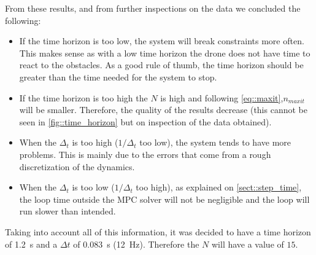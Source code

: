 From these results, and from further inspections on the data we concluded the following:
\begin{itemize}
	\item If the time horizon is too low, the system will break constraints more often. This makes sense as with a low time horizon the drone does not have time to react to the obstacles. As a good rule of thumb, the time horizon should be greater than the time needed for the system to stop.
	\item If the time horizon is too high the $N$ is high and following \cref{eq::maxit},$n_{maxit}$ will be smaller. Therefore, the quality of the results decrease (this cannot be seen in \cref{fig::time_horizon} but on inspection of the data obtained). 
	\item When the $\Delta_t$ is too high ($1/\Delta_t$ too low), the system tends to have more problems. This is mainly due to the errors that come from a rough discretization of the dynamics.
	\item When the $\Delta_t$ is too low ($1/\Delta_t$ too high), as explained on \cref{sect::step_time}, the loop time outside the \ac{MPC} solver will not be negligible and the loop will run slower than intended.
\end{itemize}

Taking into account all of this information, it was decided to have a time horizon of \SI{1.2}{\second} and a $\Delta t$ of \SI{0.083}{\second} (\SI{12}{\hertz}). Therefore the $N$ will have a value of $15$.

